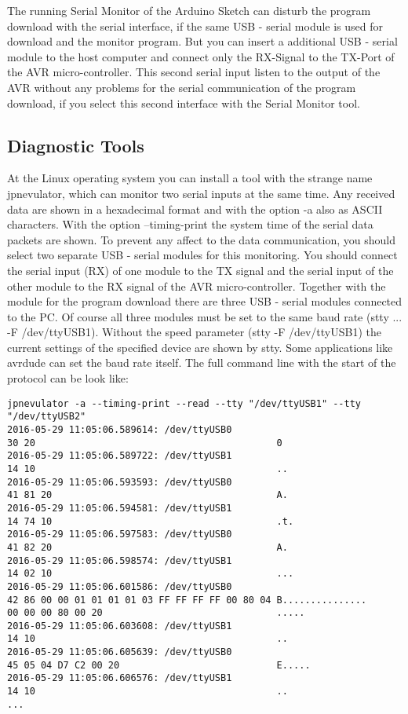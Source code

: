 The running Serial Monitor of the Arduino Sketch can disturb the program download with the
serial interface, if the same USB - serial module is used for download and the monitor program.
But you can insert a additional USB - serial module to the host computer and connect
only the RX-Signal to the TX-Port of the AVR micro-controller.
This second serial input listen to the output of the AVR without any problems
for the serial communication of the program download, if you select
this second interface with the Serial Monitor tool.

\subsection{Diagnostic Tools}
At the Linux operating system you can install a tool with the strange name jpnevulator, which
can monitor two serial inputs at the same time.
Any received data are shown in a hexadecimal format and with the option -a also as ASCII characters.
With the option --timing-print the system time of the serial data packets are shown.
To prevent any affect to the data communication, you should select two
separate USB - serial modules for this monitoring.
You should connect the serial input (RX) of one module to the TX signal and the 
serial input of the other module to the RX signal of the AVR micro-controller.
Together with the module for the program download there are three USB - serial modules
connected to the PC.
Of course all three modules must be set to the same baud rate (stty ... -F /dev/ttyUSB1).
Without the speed parameter (stty -F /dev/ttyUSB1) the current settings 
of the specified device are shown by stty.
Some applications like avrdude can set the baud rate itself.
The full command line with the start of the protocol can be look like:
\begin{verbatim}
jpnevulator -a --timing-print --read --tty "/dev/ttyUSB1" --tty "/dev/ttyUSB2"
2016-05-29 11:05:06.589614: /dev/ttyUSB0
30 20                                           0
2016-05-29 11:05:06.589722: /dev/ttyUSB1
14 10                                           ..
2016-05-29 11:05:06.593593: /dev/ttyUSB0
41 81 20                                        A.
2016-05-29 11:05:06.594581: /dev/ttyUSB1
14 74 10                                        .t.
2016-05-29 11:05:06.597583: /dev/ttyUSB0
41 82 20                                        A.
2016-05-29 11:05:06.598574: /dev/ttyUSB1
14 02 10                                        ...
2016-05-29 11:05:06.601586: /dev/ttyUSB0
42 86 00 00 01 01 01 01 03 FF FF FF FF 00 80 04 B...............
00 00 00 80 00 20                               .....
2016-05-29 11:05:06.603608: /dev/ttyUSB1
14 10                                           ..
2016-05-29 11:05:06.605639: /dev/ttyUSB0
45 05 04 D7 C2 00 20                            E.....
2016-05-29 11:05:06.606576: /dev/ttyUSB1
14 10                                           ..
...
\end{verbatim}
